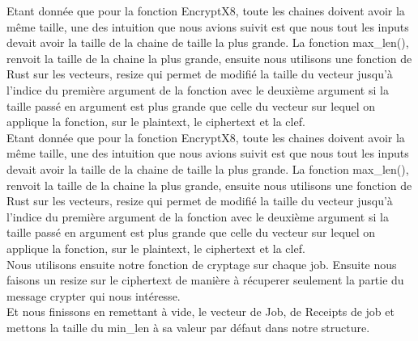 \documentclass{article}
\begin{document}

Etant donnée que pour la fonction EncryptX8, toute les chaines doivent avoir la même taille, une des intuition que nous avions suivit est que nous tout les inputs devait avoir la taille de la chaine de taille la plus grande. La fonction max\_len(), renvoit la taille de la chaine la plus grande, ensuite nous utilisons une fonction de Rust sur les vecteurs, resize qui permet de modifié la taille du vecteur jusqu'à l'indice du première argument de la fonction avec le deuxième argument si la taille passé en argument est plus grande que celle du vecteur sur lequel on applique la fonction, sur le plaintext, le ciphertext et la clef.\\
Etant donnée que pour la fonction EncryptX8, toute les chaines doivent avoir la même taille, une des intuition que nous avions suivit est que nous tout les inputs devait avoir la taille de la chaine de taille la plus grande. La fonction max\_len(), renvoit la taille de la chaine la plus grande, ensuite nous utilisons une fonction de Rust sur les vecteurs, resize qui permet de modifié la taille du vecteur jusqu'à l'indice du première argument de la fonction avec le deuxième argument si la taille passé en argument est plus grande que celle du vecteur sur lequel on applique la fonction, sur le plaintext, le ciphertext et la clef. \\
Nous utilisons ensuite notre fonction de cryptage sur chaque job. Ensuite nous faisons un resize sur le ciphertext de manière à récuperer seulement la partie du message crypter qui nous intéresse.\\
Et nous finissons en remettant à vide, le vecteur de Job, de Receipts de job et mettons la taille du min\_len à sa valeur par défaut dans notre structure.
\end{document}
